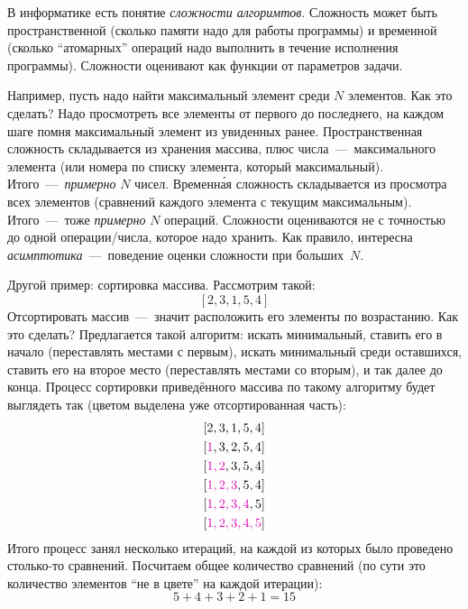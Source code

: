 \documentclass[a4paper,12pt]{article}
\begin{document}
  \begin{remark}
    В информатике есть понятие \emph{сложности алгоримтов}.
    Сложность может быть пространственной (сколько памяти надо для работы программы) и временной (сколько ``атомарных'' операций надо выполнить в течение исполнения программы).
    Сложности оценивают как функции от параметров задачи.
    
    Например, пусть надо найти максимальный элемент среди $N$ элементов.
    Как это сделать?
    Надо просмотреть все элементы от первого до последнего, на каждом шаге помня максимальный элемент из увиденных ранее.
    Пространственная сложность складывается из хранения массива, плюс числа~---~максимального элемента (или номера по списку элемента, который максимальный).
    Итого~---~\emph{примерно} $N$ чисел.
    Временн\'{а}я сложность складывается из просмотра всех элементов (сравнений каждого элемента с текущим максимальным).
    Итого~---~тоже \emph{примерно} $N$ операций.
    Сложности оцениваются не с точностью до одной операции/числа, которое надо хранить.
    Как правило, интересна \emph{асимптотика}~---~поведение оценки сложности при больших~$N$.
    
    Другой пример: сортировка массива.
    Рассмотрим такой:
    \[
      [2, 3, 1, 5, 4]
    \]
    Отсортировать массив~---~значит расположить его элементы по возрастанию.
    Как это сделать?
    Предлагается такой алгоритм: искать минимальный, ставить его в начало (переставлять местами с первым), искать минимальный среди оставшихся, ставить его на второе место (переставлять местами со вторым), и так далее до конца.
    Процесс сортировки приведённого массива по такому алгоритму будет выглядеть так (цветом выделена уже отсортированная часть):
    \[
      \begin{aligned}
        &[2, 3, 1, 5, 4]\\
        &[\textcolor{pink}{1}, 3, 2, 5, 4]\\
        &[\textcolor{pink}{1, 2}, 3, 5, 4]\\
        &[\textcolor{pink}{1, 2, 3}, 5, 4]\\
        &[\textcolor{pink}{1, 2, 3, 4}, 5]\\
        &[\textcolor{pink}{1, 2, 3, 4, 5}]\\
      \end{aligned}
    \]
    Итого процесс занял несколько итераций, на каждой из которых было проведено столько-то сравнений.
    Посчитаем общее количество сравнений (по сути это количество элементов ``не в цвете'' на каждой итерации):
    \[
      5 + 4 + 3 + 2 + 1 = 15
    \]
    

\end{remark}
\end{document}
